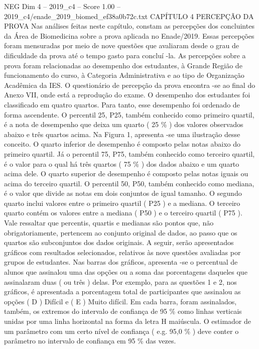 \begin{textsample}{NEG Dim 4 – 2019\_c4 – Score 1.00 – 2019\_c4/enade\_2019\_biomed\_ef38a0b72c.txt}  \label{ex:f4_neg_240}
CAPÍTULO 4 PERCEPÇÃO DA PROVA Nas análises feitas neste capítulo, constam as percepções dos concluintes da Área de Biomedicina sobre a prova aplicada no Enade/2019.
Essas percepções foram mensuradas por meio de nove questões que avaliaram desde o grau de dificuldade da prova até o tempo gasto para concluí -la.
As percepções sobre a prova foram relacionadas ao desempenho dos estudantes, à Grande Região de funcionamento do curso, à Categoria Administrativa e ao tipo de Organização Acadêmica da IES.
O questionário de percepção da prova encontra -se ao final do Anexo VII, onde está a reprodução do exame.
O desempenho dos estudantes foi classificado em quatro quartos.
Para tanto, esse desempenho foi ordenado de forma ascendente.
O percentil 25, P25, também conhecido como primeiro quartil, é a nota de desempenho que deixa um quarto ( 25 \% ) dos valores observados abaixo e três quartos acima.
Na Figura 1, apresenta -se uma ilustração desse conceito.
O quarto inferior de desempenho é composto pelas notas abaixo do primeiro quartil.
Já o percentil 75, P75, também conhecido como terceiro quartil, é o valor para o qual há três quartos ( 75 \% ) dos dados abaixo e um quarto acima dele.
O quarto superior de desempenho é composto pelas notas iguais ou acima do terceiro quartil.
O percentil 50, P50, também conhecido como mediana, é o valor que divide as notas em dois conjuntos de igual tamanho.
O segundo quarto inclui valores entre o primeiro quartil ( P25 ) e a mediana.
O terceiro quarto contém os valores entre a mediana ( P50 ) e o terceiro quartil ( P75 ).
Vale ressaltar que percentis, quartis e medianas são pontos que, não obrigatoriamente, pertencem ao conjunto original de dados, ao passo que os quartos são subconjuntos dos dados originais.
A seguir, serão apresentados gráficos com resultados selecionados, relativos às nove questões avaliadas por grupos de estudantes.
Nas barras dos gráficos, apresenta -se o percentual de alunos que assinalou uma das opções ou a soma das porcentagens daqueles que assinalaram duas ( ou três ) delas.
Por exemplo, para as questões 1 e 2, nos gráficos, é apresentada a porcentagem total de participantes que assinalou as opções ( D ) Difícil e ( E ) Muito difícil.
Em cada barra, foram assinalados, também, os extremos do intervalo de confiança de 95 \% como linhas verticais unidas por uma linha horizontal na forma da letra H maiúscula.
O estimador de um parâmetro com um certo nível de confiança ( e.g. 95,0 \% ) deve conter o parâmetro no intervalo de confiança em 95 \% das vezes.

\end{textsample}
